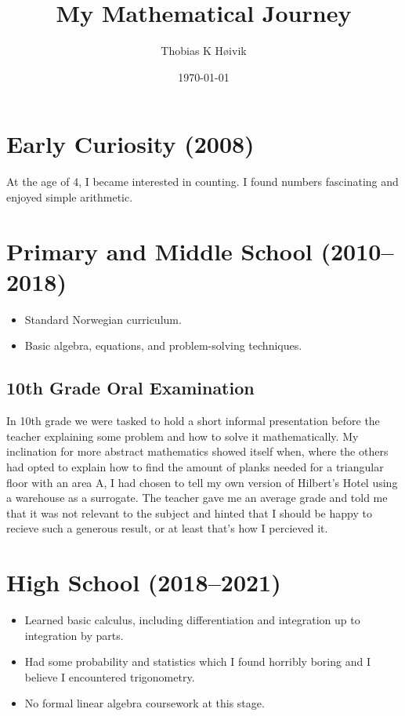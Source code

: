 \documentclass{article}
\title{My Mathematical Journey}
\author{Thobias K Høivik}
\date{\today}
\begin{document}
\maketitle

\section{Early Curiosity (2008)}
At the age of 4, I became interested in counting. I found numbers fascinating and enjoyed simple arithmetic.

\section{Primary and Middle School (2010--2018)}
\begin{itemize}
    \item Standard Norwegian curriculum.
    \item Basic algebra, equations, and problem-solving techniques.
\end{itemize}
\subsection*{10th Grade Oral Examination}
In 10th grade we were tasked to hold a short informal presentation before the teacher explaining some problem and how to solve it mathematically. 
My inclination for more abstract mathematics showed itself when, where the others had opted to explain how to find the amount of planks needed for a triangular floor with an area A, I had chosen to tell my own version of Hilbert's Hotel using a warehouse as a surrogate.
The teacher gave me an average grade and told me that it was not relevant to the subject and hinted that I should be happy to recieve such a generous result, or at least that's how I percieved it.

\section{High School (2018--2021)}
\begin{itemize}
    \item Learned basic calculus, including differentiation and integration up to integration by parts.
    \item Had some probability and statistics which I found horribly boring and I believe I encountered trigonometry.
    \item No formal linear algebra coursework at this stage.
\end{itemize}
\end{document}
